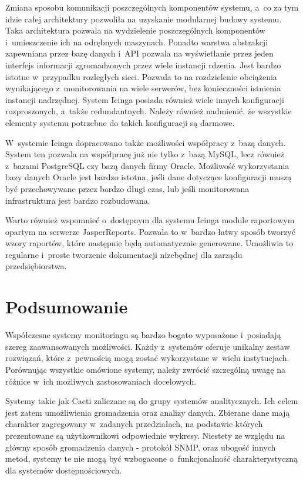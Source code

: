 Zmiana sposobu komunikacji poszczególnych komponentów systemu, a~co za
tym idzie całej architektury pozwoliła na uzyskanie modularnej budowy
systemu. Taka architektura pozwala na wydzielenie poszczególnych
komponentów i~umieszczenie ich na odrębnych maszynach. Ponadto warstwa
abstrakcji zapewniana przez bazę danych i~API pozwala na wyświetlanie
przez jeden interfejs informacji zgromadzonych przez wiele instancji
rdzenia. Jest bardzo istotne w~przypadku rozległych sieci. Pozwala to
na rozdzielenie obciążenia wynikającego z~monitorowania na wiele
serwerów, bez konieczności istnienia instancji nadrzędnej. System
Icinga posiada również wiele innych konfiguracji rozproszonych,
a~także redundantnych. Należy również nadmienić, że wszystkie elementy
systemu potrzebne do takich konfiguracji są darmowe.

W~systemie Icinga dopracowano także możliwości współpracy
z~bazą danych. System ten pozwala na współpracę już nie tylko z~bazą
MySQL, lecz również z~bazami PostgreSQL czy bazą danych firmy
Oracle. Możliwość wykorzystania bazy danych Oracle jest bardzo
istotna, jeśli dane dotyczące konfiguracji muszą być przechowywane
przez bardzo długi czas, lub jeśli monitorowana infrastruktura jest
bardzo rozbudowana.

Warto również wspomnieć o~dostępnym dla systemu Icinga module
raportowym opartym na serwerze
JasperReports\cite{www:JasperReports}. Pozwala to w~bardzo łatwy
sposób tworzyć wzory raportów, które następnie będą automatycznie
generowane. Umożliwia to regularne i~proste tworzenie dokumentacji
nizebędnej dla zarządu przedsiębiorstwa.

\section[Podsumowanie][Podsumowanie]{Podsumowanie}

Współczesne systemy monitoringu są bardzo bogato wyposażone
i~posiadają szereg zaawansowanych możliwości. Każdy z~systemów oferuje
unikalny zestaw rozwiązań, które z~pewnością mogą zostać wykorzystane
w~wielu instytucjach. Porównując wszystkie omówione systemy, należy
zwrócić szczególną uwagę na różnice w~ich możliwych zastosowaniach
docelowych.

Systemy takie jak Cacti zaliczane są do grupy systemów
analitycznych. Ich celem jest zatem umożliwienia gromadzenia oraz
analizy danych. Zbierane dane mają charakter zagregowany w~zadanych
przedziałach, na podstawie których prezentowane są użytkownikowi
odpowiednie wykresy. Niestety ze względu na główny sposób gromadzenia
danych - protokół SNMP, oraz ubogość innych metod, systemy te nie mogą
być wzbogacone o~funkcjonalność charakterystyczną dla systemów
dostępnościowych.

